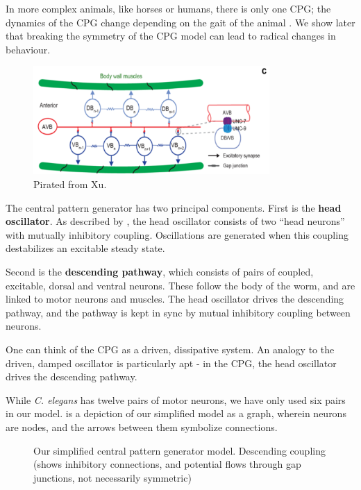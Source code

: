 \documentclass[
    11pt,
]{article}
\begin{document}
In more complex animals, like horses or humans, there is only one CPG; the dynamics of the CPG change depending on the gait of the animal \citep{collins1994}.  We show later that breaking the symmetry of the CPG model can lead to radical changes in behaviour.

\begin{figure}[h!]
    \label{fig: xu_cpg}
    \centering
    \includegraphics[width=9cm]{figures/xu_cpg/xu_cpg.png}
    \caption{Pirated from Xu.}
\end{figure}

The central pattern generator has two principal components.  First is the \textbf{head oscillator}. As described by \citet{gjorgjieva2014}, the head oscillator consists of two “head neurons” with mutually inhibitory coupling.  Oscillations are generated when this coupling destabilizes an excitable steady state.

Second is the \textbf{descending pathway}, which consists of pairs of coupled, excitable, dorsal and ventral neurons.  These follow the body of the worm, and are linked to motor neurons and muscles.  The head oscillator drives the descending pathway, and the pathway is kept in sync by mutual inhibitory coupling between neurons.

One can think of the CPG as a driven, dissipative system.  An analogy to the driven, damped oscillator is particularly apt - in the CPG, the head oscillator drives the descending pathway.

While \textit{C. elegans} has twelve pairs of motor neurons, we have only used six pairs in our model.   is a depiction of our simplified model as a graph, wherein neurons are nodes, and the arrows between them symbolize connections.

\begin{figure}[h!]
    \label{fig: cpg}
    \centering
    \caption{Our simplified central pattern generator model.  Descending coupling (shows inhibitory connections, and potential flows through gap junctions, not necessarily symmetric)}
\end{figure} %
\end{document}
